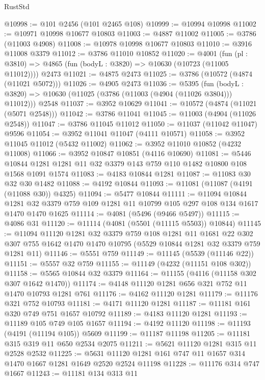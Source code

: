 \begin{lexlean}{RustStd}
\begin{coremodule}
@10998 := @101 @2456 (@101 @2465 @108)
@10999 := @10994 @10998
@11002 := @10971 @10998 @10677 @10803
@11003 := @4887 @11002
@11005 := @3786 (@11003 @4908)
@11008 := @10978 @10998 @10677 @10803
@11010 := @3916 @11008 @3379
@11012 := @3786 @11010 @10852
@11020 := @4001
    (fun (pl : @3810) => @4865 (fun (bodyL : @3820) => @10630 (@10723 (@11005 @11012))))
    @2473
@11021 := @4875 @2473
@11025 := @3786 (@10572 (@4874 (@11021 @5072)))
@11026 := @4905 @2473
@11036 := @5395
    (fun (bodyL : @3820) => @10630 (@11025 (@3786 (@11003 (@4904 (@11026 @3804))) @11012)))
    @2548
@11037 := @3952 @10629
@11041 := @10572 (@4874 (@11021 (@5071 @2548)))
@11042 := @3786 @11041
@11045 := @11003 (@4904 (@11026 @2548))
@11047 := @3786 @11045 @11012
@11050 := @11037 (@11042 @11047) @9596
@11054 := @3952 @11041 @11047 (@4111 @10571)
@11058 := @3952 @11045 @11012 (@5432 @11002)
@11062 := @3952 @11010 @10852 (@4232 @11008)
@11066 := @3952 @10847 @10851 (@4116 @10690)
@11081 := @5446 @10844 @1281 @1281 @11 @32 @3379 @143 @759 @110 @1482 @10800 @108 @1568 @1091 @1574
@11083 := @4183 @10844 @1281
@11087 := @11083 @30 @32 @30 @1482
@11088 := @4192 @10844
@11093 := @11081 (@11087 (@4191 (@11088 @30)) @4325)
@11094 := @5477 @10844
@11111 := @11094
    @10844
    @1281
    @32
    @3379
    @759
    @109
    @1281
    @11
    @10799
    @105
    @297
    @108
    @134
    @1617
    @1470
    @1470
    @1625
@11114 := @4081 (@5496 (@9466 @5497))
@11115 := @4086 @31
@11120 := @11114 (@4081 (@5501 (@11115 @5503)) @10844)
@11145 := @11094
    @11120
    @1281
    @32
    @3379
    @759
    @108
    @1281
    @11
    @1681
    @22
    @302
    @307
    @755
    @1642
    @1470
    @1470
    @10795
    (@5529 @10844 @1281 @32 @3379 @759 @1281 @11)
@11146 := @5551 @759
@11149 := @11145 (@5539 (@11146 @22))
@11151 := @5557 @32 @759
@11155 := @11149 (@4232 (@11151 @108 @302))
@11158 := @5565 @10844 @32 @3379
@11164 := @11155 (@4116 (@11158 @302 @307 @1642 @1470))
@11174 := @4148 @11120 @1281 @656 @321 @752 @11 @1470 @10793 @1281 @761
@11176 := @4162 @11120 @1281
@11179 := @11176 @321 @752 @10793
@11181 := @4171 @11120 @1281
@11187 := @11181 @161 @320 @749 @751 @1657 @10792
@11189 := @4183 @11120 @1281
@11193 := @11189 @105 @749 @105 @1657
@11194 := @4192 @11120
@11198 := @11193 (@4191 (@11194 @105)) @5609
@11199 := @11187 @11198
@11205 := @11181 @315 @319 @11 @650 @2534 @2075
@11211 := @5621 @11120 @1281 @315 @11 @2528 @2532
@11225 := @5631 @11120 @1281 @161 @747 @11 @1657 @314 @1470 @1667 @1281 @1649 @2520 @2524 @11198
@11228 := @11176 @314 @747 @1667
@11243 := @11181
    @134
    @313
    @11

\end{coremodule}
\end{lexlean}
